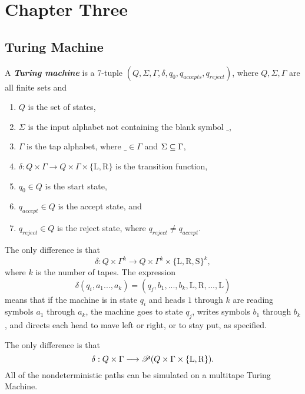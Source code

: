 \documentclass[12pt]{article}
\begin{document}
\section{Chapter Three}
\label{sec:orgeec4b9d}
\subsection{Turing Machine}
\label{sec:orgaeaab3d}
\begin{definition}
  A  \textit{\textbf{Turing  machine}}  is  a  7-tuple  $(Q,  \Sigma,  \Gamma,  \delta,  q_0,
  q_{accepts}, q_{reject})$, where $Q, \Sigma, \Gamma$ are all finite sets and
  \begin{enumerate}
  \item $Q$ is the set of states,
  \item $\Sigma$ is the input alphabet not containing the blank symbol $\_$,
  \item $\Gamma$ is the tap alphabet, where $\_ \in \Gamma$ and $\Sigma \subseteq \Gamma$,
  \item $\delta : Q \times \Gamma \longrightarrow Q \times  \Gamma \times \{ $L$, $R$ \}$ is the transition
    function,
  \item $q_0 \in Q$ is the start state,
  \item $q_{accept} \in Q$ is the accept state, and
  \item $q_{reject} \in Q$ is the reject state, where $q_{reject} \ne q_{accept}$.
  \end{enumerate}
\end{definition}

\begin{definition}
  The  only difference  is that  $$\delta :  Q  \times \Gamma^k  \longrightarrow Q  \times \Gamma^k  \times
  \{\text{L}, \text{R}, \text{S}\}^k,$$ where $k$ is the number of tapes. The
  expression  $$\delta(q_i,  a_1  ...,  a_k)  = (q_j,  b_1,  ...,  b_k,  \text{L},
  \text{R}, ..., \text{L})$$ means that if  the machine is in state $q_i$ and
  heads $1$ through $k$ are reading  symbols $a_1$ through $a_k$, the machine
  goes to state  $q_j$, writes symbols $b_1$ through $b_k$,  and directs each
  head to mave left or right, or to stay put, as specified.
\end{definition}


\begin{definition}
  The  only difference  is that  $$\delta :  Q \times  \Gamma \longrightarrow  \mathscr{P}(Q \times  \Gamma \times
  \{\text{L},  \text{R}\}).$$  All  of  the  nondeterministic  paths  can  be
  simulated on a multitape Turing Machine.
\end{definition}
\end{document}
